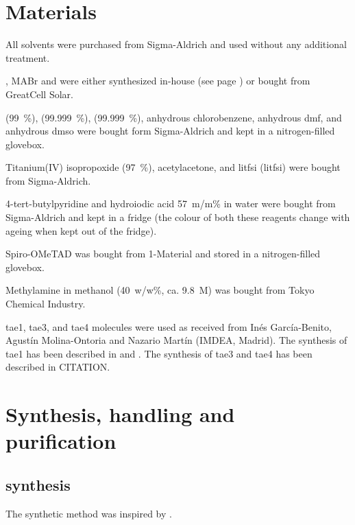 \section{Materials}

	All solvents were purchased from Sigma-Aldrich and used without any additional treatment.
	
	,  MABr and  were either synthesized in-house (see page \pageref{methods-MAI}) or bought from GreatCell Solar.
	
	\PbItwo (99~\%), \PbBrtwo (99.999~\%), \CsI (99.999~\%), anhydrous chlorobenzene, anhydrous \gls{dmf}, and anhydrous \gls{dmso} were bought form Sigma-Aldrich and kept in a nitrogen-filled glovebox.
	
	Titanium(IV) isopropoxide (97~\%), acetylacetone, and \glsdesc{litfsi} (\gls{litfsi}) were bought from Sigma-Aldrich.
	
	4-tert-butylpyridine and hydroiodic acid 57~m/m\% in water were bought from Sigma-Aldrich and kept in a fridge (the colour of both these reagents change with ageing when kept out of the fridge).
	
	Spiro-OMeTAD was bought from 1-Material and stored in a nitrogen-filled glovebox.
	
	Methylamine in methanol (40~w/w\%, ca. 9.8~M) was bought from Tokyo Chemical Industry.
	
	\Gls{tae1}, \gls{tae3}, and \gls{tae4} molecules were used as received from Inés García-Benito, Agustín Molina-Ontoria and Nazario Martín (IMDEA, Madrid). The synthesis of \gls{tae1} has been described in  and . The synthesis of \gls{tae3} and \gls{tae4} has been described in CITATION.

\section{Synthesis, handling and purification}

	\subsection{ synthesis}\label{methods-MAI}
	
		
		The synthetic method was inspired by \cite{Im2011a, Aharon2014, Williams2014, Etgar2012a, Nagaoka2015}.
		
